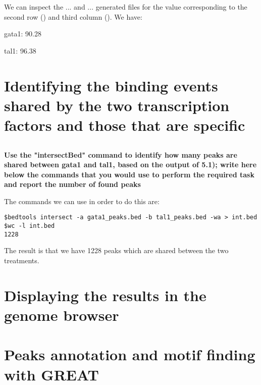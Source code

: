 \documentclass[12pt, a4paper]{article}
\begin{document}
We can inspect the ... and ... generated files for the value corresponding to the second row () and third column (). We have:

gata1: 90.28

tal1: 96.38


\section{Identifying the binding events shared by the two transcription factors and those that are specific}

\subsection{}
\textbf{Use the "intersectBed" command to identify how many peaks are shared between gata1 and tal1, based on the output of 5.1); write here below the commands that you would use to perform the required task and report the number of found peaks}

The commands we can use in order to do this are:

\begin{verbatim}
$bedtools intersect -a gata1_peaks.bed -b tal1_peaks.bed -wa > int.bed
$wc -l int.bed
1228
\end{verbatim}

The result is that we have 1228 peaks which are shared between the two treatments.

\section{Displaying the results in the genome browser}

\section{Peaks annotation and motif finding with GREAT}
\end{document}
